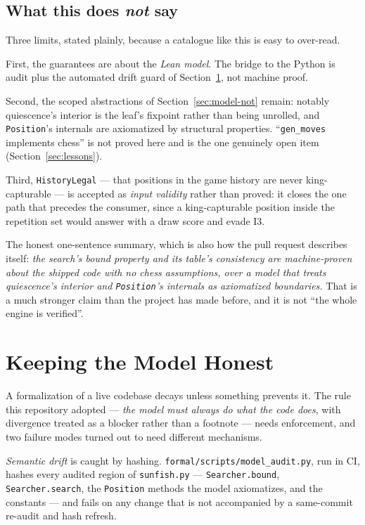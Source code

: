 \documentclass[11pt]{article}
\theoremstyle{plain}
\theoremstyle{definition}
\theoremstyle{remark}
\begin{document}
\subsection{What this does \emph{not} say}

Three limits, stated plainly, because a catalogue like this is easy to
over-read.

First, the guarantees are about the \emph{Lean model}.  The bridge to
the Python is audit plus the automated drift guard of
Section~\ref{sec:drift}, not machine proof.

Second, the scoped abstractions of Section~\ref{sec:model-not} remain:
notably quiescence's interior is the leaf's fixpoint rather than being
unrolled, and \texttt{Position}'s internals are axiomatized by
structural properties.  ``\texttt{gen\_moves} implements chess'' is not
proved here and is the one genuinely open item
(Section~\ref{sec:lessons}).

Third, \texttt{HistoryLegal} --- that positions in the game history are
never king-capturable --- is accepted as \emph{input validity} rather
than proved: it closes the one path that precedes the consumer, since a
king-capturable position inside the repetition set would answer with a
draw score and evade I3.

The honest one-sentence summary, which is also how the pull request
describes itself: \emph{the search's bound property and its table's
consistency are machine-proven about the shipped code with no chess
assumptions, over a model that treats quiescence's interior and
\texttt{Position}'s internals as axiomatized boundaries.}  That is a
much stronger claim than the project has made before, and it is not
``the whole engine is verified''.

\section{Keeping the Model Honest}
\label{sec:drift}

A formalization of a live codebase decays unless something prevents it.
The rule this repository adopted --- \emph{the model must always do
what the code does}, with divergence treated as a blocker rather than a
footnote --- needs enforcement, and two failure modes turned out to
need different mechanisms.

\emph{Semantic drift} is caught by hashing.
\texttt{formal/scripts/model\_audit.py}, run in CI, hashes every
audited region of \texttt{sunfish.py} --- \texttt{Searcher.bound},
\texttt{Searcher.search}, the \texttt{Position} methods the model
axiomatizes, and the constants --- and fails on any change that is not
accompanied by a same-commit re-audit and hash refresh.
\end{document}
